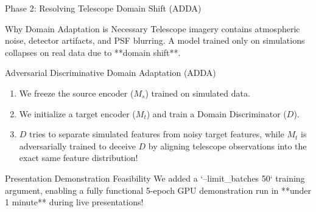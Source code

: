 \documentclass[10pt]{beamer}
\begin{document}
\begin{frame}{Phase 2: Resolving Telescope Domain Shift (ADDA)}
    \begin{block}{Why Domain Adaptation is Necessary}
        Telescope imagery contains atmospheric noise, detector artifacts, and PSF blurring. A model trained only on simulations collapses on real data due to **domain shift**.
    \end{block}
    \begin{block}{Adversarial Discriminative Domain Adaptation (ADDA)}
        \begin{enumerate}
            \item We freeze the source encoder ($M_s$) trained on simulated data.
            \item We initialize a target encoder ($M_t$) and train a Domain Discriminator ($D$).
            \item $D$ tries to separate simulated features from noisy target features, while $M_t$ is adversarially trained to deceive $D$ by aligning telescope observations into the exact same feature distribution!
        \end{enumerate}
    \end{block}
    \begin{block}{Presentation Demonstration Feasibility}
        We added a `--limit_batches 50` training argument, enabling a fully functional 5-epoch GPU demonstration run in **under 1 minute** during live presentations!
    \end{block}
\end{frame}
\end{document}
